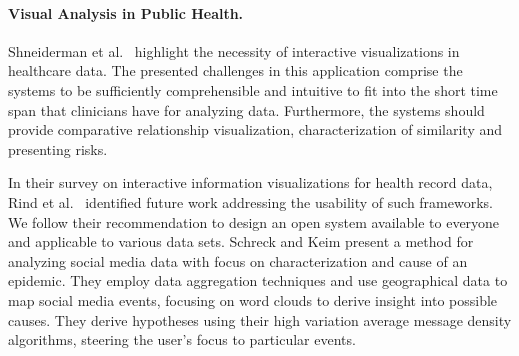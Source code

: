 \documentclass[journal]{style/vgtc} 			          %
\begin{document}
\paragraph{Visual Analysis in Public Health.}
Shneiderman et al.~\cite{Shneiderman2013} highlight the necessity of interactive visualizations in healthcare data. %
The presented challenges in this application comprise the systems to be sufficiently comprehensible and intuitive to fit into the short time span that clinicians have for analyzing data.
Furthermore, the systems should provide comparative relationship visualization, characterization of similarity and presenting risks.

In their survey on interactive information visualizations for health record data, Rind et al.~\cite{Rind} identified future work addressing the usability of such frameworks.
We follow their recommendation to design an open system available to everyone and applicable to various data sets.
Schreck and Keim \cite{Schreck} present a method for analyzing social media data with focus on characterization and cause of an epidemic.
They employ data aggregation techniques and use geographical data to map social media events, focusing on word clouds to derive insight into possible causes.
They derive hypotheses using their high variation average message density algorithms, steering the user's focus to particular events.
\end{document}
